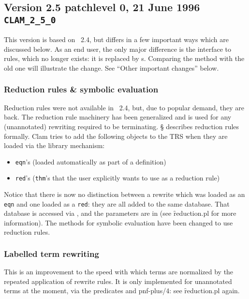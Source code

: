 \subsection {Version 2.5 patchlevel 0, 21 June 1996 {\tt CLAM\_2\_5\_0}}

This version is based on \clam~2.4, but differs in a few important
ways which are discussed below.  As an end user, the only major
difference is the interface to  rules, which no longer
exists: it is replaced by s.  Comparing the
 method with the old one will illustrate the change.
See ``Other important changes'' below.

\subsubsection* {Reduction rules \& symbolic evaluation}
        Reduction rules were not available in \clam~2.4, but, due to
popular demand, they are back.  The reduction rule machinery has been
generalized and is used for any (unannotated) rewriting required to be
terminating.  \S{} describes reduction rules
formally. 
        Clam tries to add the following objects to the TRS when they
are loaded via the library mechanism:
\begin{itemize}
        \item {\tt eqn}'s (loaded automatically as part of a definition)
        \item {\tt red}'s ({\tt thm}'s that the user explicitly wants to use as a
          reduction rule)
\end{itemize}
Notice that there is now no distinction between a rewrite which was
loaded as an {\tt eqn} and one loaded as a {\tt red}: they are all added to the
same database.  That database is accessed via , and
the parameters are in  (see \f{reduction.pl} for more
information).
        The methods for symbolic evaluation have been changed to use
reduction rules.

\subsubsection* {Labelled term rewriting}
        This is an improvement to the speed with which terms are
normalized by the repeated application of rewrite rules.  It is only
implemented for unannotated terms at the moment, via the predicates
 and p{nf-plus/4}: see \f{reduction.pl} again.  

